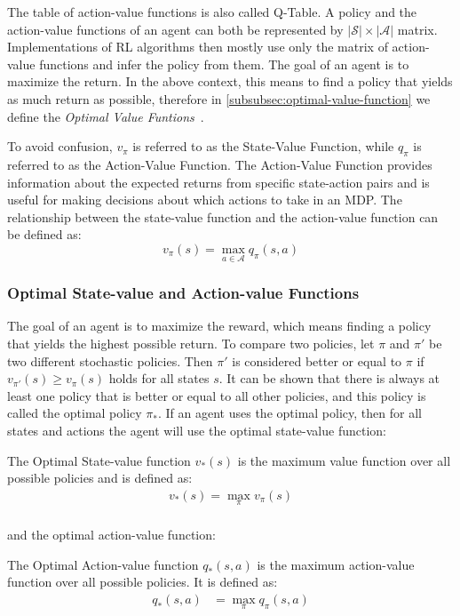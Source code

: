 \documentclass[../xlapes02]{subfiles}
\begin{document}
    The table of action-value functions is also called Q-Table. A policy and the action-value functions of an agent can both be represented by $|\mathcal{S}|\times|\mathcal{A}|$ matrix. Implementations of RL algorithms then mostly use only the matrix of action-value functions and infer the policy from them. The goal of an agent is to maximize the return. In the above context, this means to find a policy that yields as much return as possible, therefore in \cref{subsubsec:optimal-value-function} we define the \emph{Optimal Value Funtions}~\cite{sutton2018reinforcement}.

    To avoid confusion, $v_\pi$ is referred to as the State-Value Function, while $q_\pi$ is referred to as the Action-Value Function. The Action-Value Function provides information about the expected returns from specific state-action pairs and is useful for making decisions about which actions to take in an MDP. The relationship between the state-value function and the action-value function can be defined as:
    \begin{equation}
        v_\pi(s) = \max_{a\in\mathcal{A}} q_\pi(s, a)
    \end{equation}

    \subsubsection{Optimal State-value and Action-value Functions}\label{subsubsec:optimal-value-functions}
    The goal of an agent is to maximize the reward, which means finding a policy that yields the highest possible return. To compare two policies, let $\pi$ and $\pi'$ be two different stochastic policies. Then $\pi'$ is considered better or equal to $\pi$ if $v_{\pi'}(s) \geq v_{\pi}(s)$ holds for all states $s$. It can be shown that there is always at least one policy that is better or equal to all other policies, and this policy is called the optimal policy $\pi_*$. If an agent uses the optimal policy, then for all states and actions the agent will use the optimal state-value function:
    \begin{definition}
        The Optimal State-value function $v_*(s)$ is the maximum value function over all possible policies and is defined as:
        \begin{equation}
            \begin{split}
                v_*(s)=\max_{\pi}v_{\pi}(s)\\
            \end{split}
        \end{equation}
    \end{definition}
    and the optimal action-value function:
    \begin{definition}
        The Optimal Action-value function $q_*(s, a)$ is the maximum action-value function over all possible policies. It is defined as:
        \begin{equation}
            \begin{split}
                q_*(s,a)&=\max_{\pi}q_{\pi}(s,a)\\
            \end{split}
        \end{equation}
    \end{definition}
\end{document}
